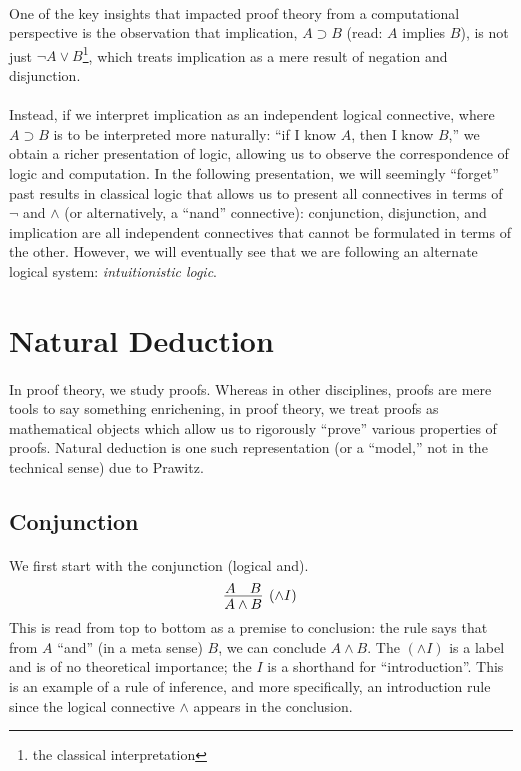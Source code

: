 \documentclass[a4paper]{article}
\begin{document}
\newpage

\paragraph{}
One of the key insights that impacted proof theory from a computational
perspective is the observation that implication, $A \supset B$ (read: $A$
implies $B$), is not just $\neg A \lor B$\footnote{the classical
interpretation}, which treats implication as a mere result of negation and
disjunction.

\paragraph{}
Instead, if we interpret implication as an independent logical connective,
where $A \supset B$ is to be interpreted more naturally: ``if I know $A$, then
I know $B$,'' we obtain a richer presentation of logic, allowing us to observe
the correspondence of logic and computation. In the following presentation, we
will seemingly ``forget'' past results in classical logic that allows us to
present all connectives in terms of $\neg$ and $\land$ (or alternatively, a
``nand'' connective): conjunction, disjunction, and implication are all
independent connectives that cannot be formulated in terms of the other.
However, we will eventually see that we are following an alternate logical
system: \textit{intuitionistic logic}.

\section{Natural Deduction}
\paragraph{}
In proof theory, we study proofs. Whereas in other disciplines, proofs are mere
tools to say something enrichening, in proof theory, we treat proofs as
mathematical objects which allow us to rigorously ``prove'' various properties
of proofs. Natural deduction is one such representation (or a ``model,'' not in
the technical sense) due to Prawitz.

\subsection{Conjunction}
\paragraph{}
We first start with the conjunction (logical and).
$$\infer[(\land I)]{A \land B}{A & B}$$
This is read from top to bottom as a premise to conclusion: the rule says that
from $A$ ``and'' (in a meta sense) $B$, we can conclude $A \land B$. The $(\land
I)$ is a label and is of no theoretical importance; the $I$ is a shorthand for
``introduction''. This is an example of a rule of inference, and more
specifically, an introduction rule since the logical connective $\land$ appears
in the conclusion.
\end{document}
